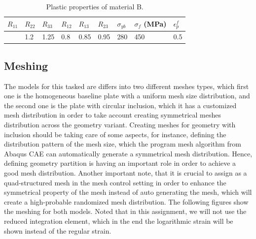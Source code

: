 \documentclass[12pt]{article}
\begin{document}
\begin{table}[H]
    \centering
    \caption{Plastic properties of material B.}
    \label{tab:materialB-plasticproperties}
    \begin{tabular}{lllllllll}
        \toprule
            \centering $R_{11}$ & $R_{22}$ & $R_{33}$ & $R_{12}$ & $R_{13}$ & $R_{23}$ & $\sigma_{yb}$ & 
            $\sigma_{f}$ (MPa) & $\epsilon_{p}^{f}$  \\
            \midrule
            \centering 1 & 1.2 & 1.25 & 0.8 & 0.85 & 0.95 & 280 & 450 & 0.5 \\
            \bottomrule
    \end{tabular}
\end{table}
\subsection{Meshing}
\hspace{2em}The models for this tasked are differs into two different 
meshes types, which first one is the homogeneous baseline plate 
with a uniform mesh size distribution, and the 
second one is the plate with circular inclusion,
which it has a customized mesh distribution in order to 
take account creating symmetrical meshes distribution 
across the geometry variant. Creating meshes for geometry with inclusion
should be taking care of some aspects, for instance, defining the distribution 
pattern of the mesh size, which the program mesh algorithm from Abaqus
CAE can automatically generate a symmetrical mesh distribution. Hence, 
defining geometry partition is having an important role in order to achieve
a good mesh distribution. Another important note, that it is crucial
to assign as a quad-structured mesh in the mesh control setting in order to enhance the symmetrical property of the mesh 
instead of auto generating the mesh, which will create a high-probable randomized mesh distribution. The following figures show the meshing
for both models. Noted that in this assignment, we will not use the
reduced integration element, which in the end the logarithmic strain
will be shown instead of the regular strain. 
\end{document}

